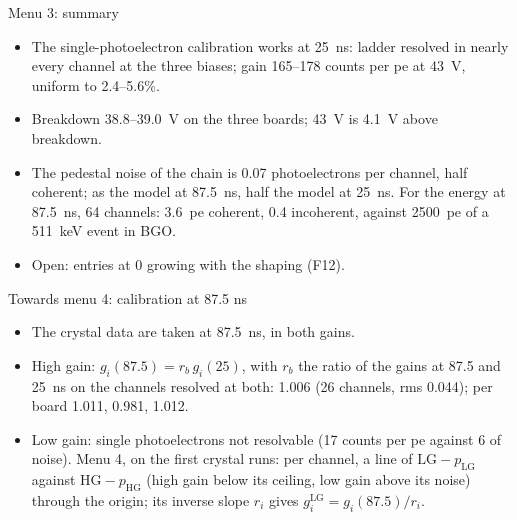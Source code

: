 \documentclass[10pt,aspectratio=169]{beamer}
\begin{document}
\begin{frame}{Menu 3: summary}
\begin{itemize}
\item The single-photoelectron calibration works at 25~ns: ladder resolved in nearly every
  channel at the three biases; gain 165--178 counts per pe at 43~V, uniform to 2.4--5.6\%.
\item Breakdown 38.8--39.0~V on the three boards; 43~V is 4.1~V above breakdown.
\item The pedestal noise of the chain is 0.07 photoelectrons per channel, half coherent; as
  the model at 87.5~ns, half the model at 25~ns. For the energy at 87.5~ns, 64 channels:
  3.6~pe coherent, 0.4 incoherent, against 2500~pe of a 511~keV event in BGO.
\item Open: entries at 0 growing with the shaping (F12).
\end{itemize}
\end{frame}

\begin{frame}{Towards menu 4: calibration at 87.5 ns}
\begin{itemize}
\item The crystal data are taken at 87.5~ns, in both gains.
\item High gain: $g_i(87.5) = r_b\, g_i(25)$, with $r_b$ the ratio of the gains at 87.5 and
  25~ns on the channels resolved at both: 1.006 (26 channels, rms 0.044); per board 1.011,
  0.981, 1.012.
\item Low gain: single photoelectrons not resolvable (17 counts per pe against 6 of noise).
  Menu 4, on the first crystal runs: per channel, a line of $\mathrm{LG} - p_\mathrm{LG}$
  against $\mathrm{HG} - p_\mathrm{HG}$ (high gain below its ceiling, low gain above its
  noise) through the origin; its inverse slope $r_i$ gives $g^\mathrm{LG}_i = g_i(87.5)/r_i$.
\end{itemize}
\end{frame}

\end{document}
